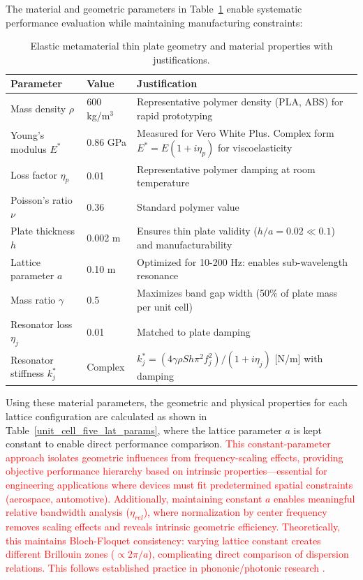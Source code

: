\documentclass[review,numbers,sort&compress]{elsarticle}
\begin{document}
The material and geometric parameters in Table~\ref{param_geo_struc_cell_unit} enable systematic performance evaluation while maintaining manufacturing constraints:
\newpage
\begin{table}[!htb]
\centering
\caption{Elastic metamaterial thin plate geometry and material properties with justifications.}
\label{param_geo_struc_cell_unit}
\small
\begin{tabular}{p{3cm}p{2.5cm}p{6cm}}
\hline
Parameter & Value & Justification \\
\hline
Mass density $\rho$ & 600 kg/m$^3$ & Representative polymer density (PLA, ABS) for rapid prototyping \\
\hline
Young's modulus $E^*$ & 0.86 GPa & Measured for Vero White Plus. Complex form $E^* = E(1+i\eta_p)$ for viscoelasticity \\
\hline
Loss factor $\eta_p$ & 0.01 & Representative polymer damping at room temperature \\
\hline
Poisson's ratio $\nu$ & 0.36 & Standard polymer value \\
\hline
Plate thickness $h$ & 0.002 m & Ensures thin plate validity ($h/a = 0.02 \ll 0.1$) and manufacturability \\
\hline
Lattice parameter $a$ & 0.10 m & Optimized for 10-200 Hz: enables sub-wavelength resonance \\
\hline
Mass ratio $\gamma$ & 0.5 & Maximizes band gap width (50\% of plate mass per unit cell) \\
\hline
Resonator loss $\eta_j$ & 0.01 & Matched to plate damping \\
\hline
Resonator stiffness $k_j^*$ & Complex & $k_j^* = (4\gamma\rho Sh\pi^2 f_j^2)/(1+i\eta_j)$ [N/m] with damping \\
\hline
\end{tabular}
\end{table}

Using these material parameters, the geometric and physical properties for each lattice configuration are calculated as shown in Table~\ref{unit_cell_five_lat_params}, where the lattice parameter $a$ is kept constant to enable direct performance comparison. \textcolor{red}{This constant-parameter approach isolates geometric influences from frequency-scaling effects, providing objective performance hierarchy based on intrinsic properties---essential for engineering applications where devices must fit predetermined spatial constraints (aerospace, automotive). Additionally, maintaining constant $a$ enables meaningful relative bandwidth analysis ($\eta_{rel}$), where normalization by center frequency removes scaling effects and reveals intrinsic geometric efficiency. Theoretically, this maintains Bloch-Floquet consistency: varying lattice constant creates different Brillouin zones ($\propto 2\pi/a$), complicating direct comparison of dispersion relations. This follows established practice in phononic/photonic research \cite{Xiao_2012, Yan2022,Villeneuve1992}.} 
\end{document}
